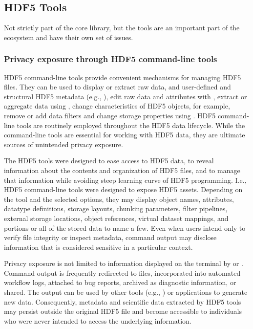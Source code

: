 \documentclass[../main.tex]{subfiles}
\begin{document}
\subsection{HDF5 Tools}

Not strictly part of the core library, but the tools are an important part of the ecosystem and have their own set of issues.

\subsubsection{Privacy exposure through HDF5 command-line tools}

HDF5 command-line tools provide convenient mechanisms for managing HDF5 files. 
They can be used to display or extract raw data, and user-defined and structural 
HDF5 metadata (e.g., ), edit raw data and attributes with , 
extract or aggregate data using , change characteristics of HDF5 objects, 
for example, remove or add data filters and change storage properties using .
 HDF5 command-line tools are routinely employed throughout the HDF5 data lifecycle. 
While the command-line tools are essential for working with HDF5 data, they are ultimate 
sources of unintended privacy exposure.

The HDF5 tools were designed to ease access to HDF5 data, to reveal information about 
the contents and organization of HDF5 files, and to manage that information while 
avoiding steep learning curve of HDF5 programming. I.e., HDF5 command-line tools were 
designed to expose HDF5 assets. Depending on the tool and the selected options, they may 
display object names, attributes, datatype definitions, storage layouts, chunking parameters, 
filter pipelines, external storage locations, object references, virtual dataset mappings, 
and portions or all of the stored data to name a few. Even when users intend only to 
verify file integrity or inspect metadata, command output may disclose information that 
is considered sensitive in a particular context.

Privacy exposure is not limited to information displayed on the terminal by  or . 
Command output is frequently redirected to files, incorporated into automated workflow logs, 
attached to bug reports, archived as diagnostic information, or shared. The output can be used by 
other tools (e.g., ) or applications to generate new data. Consequently, 
metadata and scientific data extracted by HDF5 tools may persist outside the original HDF5 
file and become accessible to individuals who were never intended to access the 
underlying information.
\end{document}
